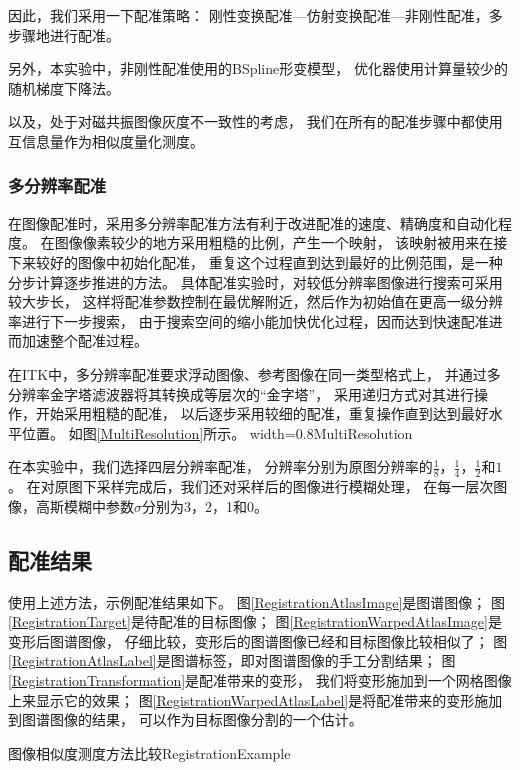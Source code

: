 因此，我们采用一下配准策略：
刚性变换配准---仿射变换配准---非刚性配准，多步骤地进行配准。

另外，本实验中，非刚性配准使用的BSpline形变模型，
优化器使用计算量较少的随机梯度下降法。

以及，处于对磁共振图像灰度不一致性的考虑，
我们在所有的配准步骤中都使用互信息量作为相似度量化测度。


\subsubsection{多分辨率配准}
在图像配准时，采用多分辨率配准方法有利于改进配准的速度、精确度和自动化程度。
在图像像素较少的地方采用粗糙的比例，产生一个映射，
该映射被用来在接下来较好的图像中初始化配准，
重复这个过程直到达到最好的比例范围，是一种分步计算逐步推进的方法。
具体配准实验时，对较低分辨率图像进行搜索可采用较大步长，
这样将配准参数控制在最优解附近，然后作为初始值在更高一级分辨率进行下一步搜索，
由于搜索空间的缩小能加快优化过程，因而达到快速配准进而加速整个配准过程。

在ITK中，多分辨率配准要求浮动图像、参考图像在同一类型格式上，
并通过多分辨率金字塔滤波器将其转换成等层次的``金字塔''，
采用递归方式对其进行操作，开始采用粗糙的配准，
以后逐步采用较细的配准，重复操作直到达到最好水平位置。
如图\ref{MultiResolution}所示。
%
{width=0.8\textwidth}{MultiResolution}

在本实验中，我们选择四层分辨率配准，
分辨率分别为原图分辨率的$\frac{1}{8}$，$\frac{1}{4}$，$\frac{1}{2}$和$1$。
在对原图下采样完成后，我们还对采样后的图像进行模糊处理，
在每一层次图像，高斯模糊中参数$\sigma$分别为3，2，1和0。

\subsection{配准结果}
使用上述方法，示例配准结果如下。
图\ref{RegistrationAtlasImage}是图谱图像；
图\ref{RegistrationTarget}是待配准的目标图像；
图\ref{RegistrationWarpedAtlasImage}是变形后图谱图像，
仔细比较，变形后的图谱图像已经和目标图像比较相似了；
图\ref{RegistrationAtlasLabel}是图谱标签，即对图谱图像的手工分割结果；
图\ref{RegistrationTransformation}是配准带来的变形，
我们将变形施加到一个网格图像上来显示它的效果；
图\ref{RegistrationWarpedAtlasLabel}是将配准带来的变形施加到图谱图像的结果，
可以作为目标图像分割的一个估计。
\begin{pics}[htpb]{图像相似度测度方法比较}{RegistrationExample}
\end{pics}

